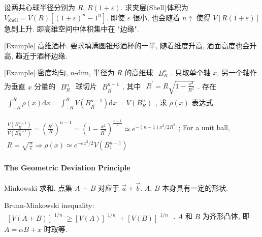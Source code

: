 \documentclass[../../main.tex]{subfiles}
\begin{document}
    设两共心球半径分别为 $R$, $R(1+\varepsilon)$. 求夹层(Shell)体积为 $V_{\text{shell}} = V(R)[(1+\varepsilon)^{n}-1^{n}]$. 即使 $\varepsilon$ 很小, 也会随着 $n\uparrow$ 使得 $V[R(1+\varepsilon)]$ 急剧上升. 即高维空间中体积集中在 "边缘".

    [Example] 高维酒杯. 要求填满圆锥形酒杯的一半, 随着维度升高, 酒面高度也会升高, 趋近于酒杯边缘.

    [Example] 密度均匀, $n$-dim, 半径为 $R$ 的高维球 $\begin{aligned}
        B_{R}^{n}
    \end{aligned}$. 只取单个轴 $x$, 另一个轴作为垂直 $x$ 分量的 $\begin{aligned}
        B_{R}^{n}
    \end{aligned}$ 球切片 $\begin{aligned}
        B_{R^{\prime}}^{n-1}
    \end{aligned}$, 其中 $\begin{aligned}
        R^{\prime} = R\sqrt{1 - \frac{x^{2}}{R^{2}}}
    \end{aligned}$. 存在 $\begin{aligned}
        \int_{-R}^{R}\rho(x)\mathrm{d}x = \int_{-R}^{R}V\left(B_{R^{\prime}}^{n-1}\right)\mathrm{d}x = V\left(B_{R}^{n}\right)
    \end{aligned}$, 求 $\rho(x)$ 表达式. 

$\begin{aligned}
        \frac{V\left(B_{R^{\prime}}^{n-1}\right)}{V\left(B_{R}^{n-1}\right)} = \left(\frac{R^{\prime}}{R}\right)^{n-1} = \left(1-\frac{x^{2}}{R^{2}}\right)^{\frac{n-1}{2}}\simeq e^{-(n-1)x^{2}/2R^{2}}\end{aligned}$; 
For a unit ball, $\begin{aligned} R = \sqrt{\frac{n}{e}}\Rightarrow\rho(x) \simeq e^{-ex^{2}/2}V(B_{1}^{n-1})
    \end{aligned}$

\paragraph{The Geometric Deviation Principle}

Minkowski 求和. 点集 $A$ + $B$ 对应于 $\vec{a}+\vec{b}$. $A$, $B$ 本身具有一定的形状.

Brunn-Minkowski inequality: 
$\begin{aligned}
    [V(A+B)]^{\begin{aligned}
        1/n
    \end{aligned}}\geq [V(A)]^{\begin{aligned}
        1/n
    \end{aligned}} + [V(B)]^{\begin{aligned}
        1/n
    \end{aligned}}
\end{aligned}$. $A$ 和 $B$ 为齐形凸体, 即 $A = \alpha B+x$ 时取等. 
\end{document}
